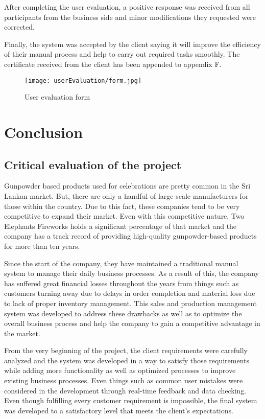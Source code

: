 \documentclass[12pt]{report}
\begin{document}
After completing the user evaluation, a positive response was received from all participants from the business side and minor modifications they requested were corrected.

Finally, the system was accepted by the client saying it will improve the efficiency of their manual process and help to carry out required tasks smoothly. The certificate received from the client has been appended to appendix F.

\begin{figure}[H]
	\centering
	\texttt{[image: userEvaluation/form.jpg]}
	\caption{User evaluation form}
\end{figure}

\chapter{Conclusion}

\section{Critical evaluation of the project}
Gunpowder based products used for celebrations are pretty common in the Sri Lankan market. But, there are only a handful of large-scale manufacturers for those within the country. Due to this fact, these companies tend to be very competitive to expand their market. Even with this competitive nature, Two Elephants Fireworks holds a significant percentage of that market and the company has a track record of providing high-quality gunpowder-based products for more than ten years.

Since the start of the company, they have maintained a traditional manual system to manage their daily business processes. As a result of this, the company has suffered great financial losses throughout the years from things such as customers turning away due to delays in order completion and material loss due to lack of proper inventory management. This sales and production management system was developed to address these drawbacks as well as to optimize the overall business process and help the company to gain a competitive advantage in the market.

From the very beginning of the project, the client requirements were carefully analyzed and the system was developed in a way to satisfy those requirements while adding more functionality as well as optimized processes to improve existing business processes. Even things such as common user mistakes were considered in the development through real-time feedback and data checking. Even though fulfilling every customer requirement is impossible, the final system was developed to a satisfactory level that meets the client's expectations.
\end{document}
